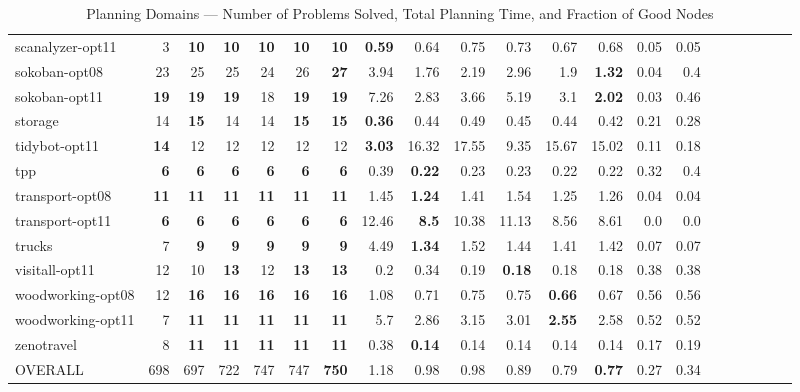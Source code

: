 \begin{table}[h!]
{\begin{tabular}{|l|r|r|r|r|r|r||r|r|r|r|r|r||r|r|r|r|r|r||r|r|}
scanalyzer-opt11 & 3 & \textbf{10} & \textbf{10} & \textbf{10} & \textbf{10} & \textbf{10} & \textbf{0.59} & 0.64 & 0.75 & 0.73 & 0.67 & 0.68 & 0.05 & 0.05 \\
sokoban-opt08 & 23 & 25 & 25 & 24 & 26 & \textbf{27} & 3.94 & 1.76 & 2.19 & 2.96 & 1.9 & \textbf{1.32} & 0.04 & 0.4 \\
sokoban-opt11 & \textbf{19} & \textbf{19} & \textbf{19} & 18 & \textbf{19} & \textbf{19} & 7.26 & 2.83 & 3.66 & 5.19 & 3.1 & \textbf{2.02} & 0.03 & 0.46 \\
storage & 14 & \textbf{15} & 14 & 14 & \textbf{15} & \textbf{15} & \textbf{0.36} & 0.44 & 0.49 & 0.45 & 0.44 & 0.42 & 0.21 & 0.28 \\
tidybot-opt11 & \textbf{14} & 12 & 12 & 12 & 12 & 12 & \textbf{3.03} & 16.32 & 17.55 & 9.35 & 15.67 & 15.02 & 0.11 & 0.18 \\
tpp & \textbf{6} & \textbf{6} & \textbf{6} & \textbf{6} & \textbf{6} & \textbf{6} & 0.39 & \textbf{0.22} & 0.23 & 0.23 & 0.22 & 0.22 & 0.32 & 0.4 \\
transport-opt08 & \textbf{11} & \textbf{11} & \textbf{11} & \textbf{11} & \textbf{11} & \textbf{11} & 1.45 & \textbf{1.24} & 1.41 & 1.54 & 1.25 & 1.26 & 0.04 & 0.04 \\
transport-opt11 & \textbf{6} & \textbf{6} & \textbf{6} & \textbf{6} & \textbf{6} & \textbf{6} & 12.46 & \textbf{8.5} & 10.38 & 11.13 & 8.56 & 8.61 & 0.0 & 0.0 \\
trucks & 7 & \textbf{9} & \textbf{9} & \textbf{9} & \textbf{9} & \textbf{9} & 4.49 & \textbf{1.34} & 1.52 & 1.44 & 1.41 & 1.42 & 0.07 & 0.07 \\
visitall-opt11 & 12 & 10 & \textbf{13} & 12 & \textbf{13} & \textbf{13} & 0.2 & 0.34 & 0.19 & \textbf{0.18} & 0.18 & 0.18 & 0.38 & 0.38 \\
woodworking-opt08 & 12 & \textbf{16} & \textbf{16} & \textbf{16} & \textbf{16} & \textbf{16} & 1.08 & 0.71 & 0.75 & 0.75 & \textbf{0.66} & 0.67 & 0.56 & 0.56 \\
woodworking-opt11 & 7 & \textbf{11} & \textbf{11} & \textbf{11} & \textbf{11} & \textbf{11} & 5.7 & 2.86 & 3.15 & 3.01 & \textbf{2.55} & 2.58 & 0.52 & 0.52 \\
zenotravel & 8 & \textbf{11} & \textbf{11} & \textbf{11} & \textbf{11} & \textbf{11} & 0.38 & \textbf{0.14} & 0.14 & 0.14 & 0.14 & 0.14 & 0.17 & 0.19 \\
\hline
OVERALL & 698 & 697 & 722 & 747 & 747 & \textbf{750} & 1.18 & 0.98 & 0.98 & 0.89 & 0.79 & \textbf{0.77} & 0.27 & 0.34 \\
\hline
\end{tabular}
}
\begin{small}
\caption{\label{tbl:rla-planning} Planning Domains --- Number of Problems
Solved, Total Planning Time, and Fraction of Good Nodes}
\end{small}
\end{table}
